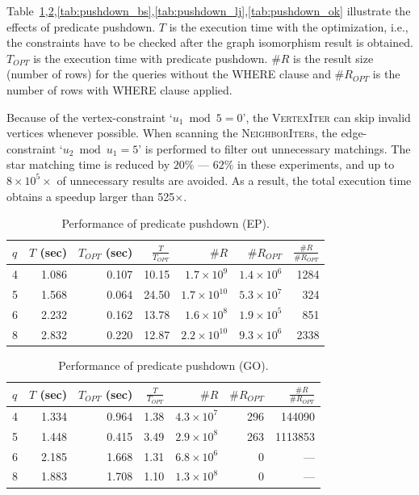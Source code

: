 Table~\ref{tab:pushdown_ep},\ref{tab:pushdown_go},\ref{tab:pushdown_bs},\ref{tab:pushdown_lj},\ref{tab:pushdown_ok} illustrate the effects of predicate pushdown.
$T$ is the execution time with the optimization, i.e., the constraints have to be checked after the graph isomorphism result is obtained.
$T_{OPT}$ is the execution time with predicate pushdown.
$\#R$ is the result size (number of rows) for the queries without the WHERE clause and $\#R_{OPT}$ is the number of rows with WHERE clause applied.

Because of the vertex-constraint `$u_1 \bmod 5 = 0$',
the \textsc{VertexIter} can skip invalid vertices whenever possible.
When scanning the \textsc{NeighborIter}s,
the edge-constraint `$u_2 \bmod u_1 = 5$' is performed to filter out unnecessary matchings.
The star matching time is reduced by $20\%$ --- $62\%$ in these experiments,
and up to $8 \times 10^5 \times$ of unnecessary results are avoided.
As a result, the total execution time obtains a speedup larger than 525$\times$.
\begin{table}
  \caption{Performance of predicate pushdown (EP).}\label{tab:pushdown_ep}
  \begin{tabular}{lrrrrrr}
    \toprule
    $q$ & \parbox{5mm}{$T$ (sec)} & \parbox{5mm}{$T_{OPT}$ (sec)} & $\frac{T}{T_{OPT}}$ & $\#R$ & $\#R_{OPT}$ & $\frac{\#R}{\#R_{OPT}}$ \\
     & 1.086 &     0.107 &     10.15 & $1.7 \times 10^9$   &   $1.4 \times 10^6$ &            1284 \\
    5 & 1.568 &     0.064 &     24.50 & $1.7 \times 10^{10}$ &   $5.3 \times 10^7$ &             324 \\
    6 & 2.232 &     0.162 &     13.78 & $1.6 \times 10^8$  &        $1.9 \times 10^5$ &             851 \\
    8 & 2.832 &     0.220 &     12.87 & $2.2 \times 10^{10}$ &   $9.3 \times 10^6$ &            2338 \\
    \bottomrule
  \end{tabular}
\end{table}

\begin{table}
  \caption{Performance of predicate pushdown (GO).}\label{tab:pushdown_go}
  \begin{tabular}{lrrrrrr}
    \toprule
    $q$ & \parbox{5mm}{$T$ (sec)} & \parbox{5mm}{$T_{OPT}$ (sec)} & $\frac{T}{T_{OPT}}$ & $\#R$ & $\#R_{OPT}$ & $\frac{\#R}{\#R_{OPT}}$ \\
     & 1.334 &     0.964 &     1.38 & $4.3\times10^7$ &           296 &               144090 \\
    5 & 1.448 &     0.415 &     3.49 & $2.9 \times 10^8$ &           263 &              1113853 \\
    6 & 2.185 &     1.668 &     1.31 & $6.8 \times 10^6$ &             0 & --- \\
    8 & 1.883 &     1.708 &     1.10 & $1.3\times10^8$ &             0 & --- \\
    \bottomrule
  \end{tabular}
\end{table}


